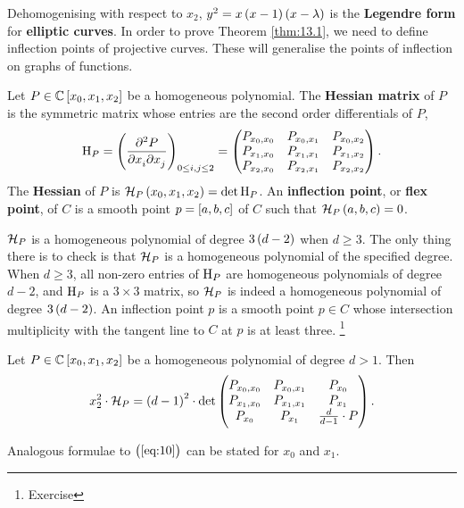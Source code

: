 Dehomogenising with respect to $ x_2 $, $ y^2 = x\br{x - 1}\br{x - \lambda} $ is the \textbf{Legendre form} for \textbf{elliptic curves}. In order to prove Theorem \ref{thm:13.1}, we need to define inflection points of projective curves. These will generalise the points of inflection on graphs of functions.

\begin{definition}
\label{def:13.2}
Let $ P \in \CC\sbr{x_0, x_1, x_2} $ be a homogeneous polynomial. The \textbf{Hessian matrix} of $ P $ is the symmetric matrix whose entries are the second order differentials of $ P $,
$$ \H_P = \br{\dmd{P}{2}{x_i}{}{x_j}{}}_{0 \le i, j \le 2} = \threebythree{P_{x_0, x_0}}{P_{x_0, x_1}}{P_{x_0, x_2}}{P_{x_1, x_0}}{P_{x_1, x_1}}{P_{x_1, x_2}}{P_{x_2, x_0}}{P_{x_2, x_1}}{P_{x_2, x_2}}. $$
The \textbf{Hessian} of $ P $ is $ \HHH_P\br{x_0, x_1, x_2} = \det \H_P $. An \textbf{inflection point}, or \textbf{flex point}, of $ C $ is a smooth point $ p = \sbr{a, b, c} $ of $ C $ such that $ \HHH_P\br{a, b, c} = 0 $.
\end{definition}

$ \mathcal{H}_P $ is a homogeneous polynomial of degree $ 3\br{d - 2} $ when $ d \ge 3 $. The only thing there is to check is that $ \mathcal{H}_P $ is a homogeneous polynomial of the specified degree. When $ d \ge 3 $, all non-zero entries of $ \mathrm{H}_P $ are homogeneous polynomials of degree $ d - 2 $, and $ \mathrm{H}_P $ is a $ 3 \times 3 $ matrix, so $ \mathcal{H}_P $ is indeed a homogeneous polynomial of degree $ 3\br{d - 2} $. An inflection point $ p $ is a smooth point $ p \in C $ whose intersection multiplicity with the tangent line to $ C $ at $ p $ is at least three. \footnote{Exercise}

\begin{lemma}
\label{lem:13.3}
Let $ P \in \CC\sbr{x_0, x_1, x_2} $ be a homogeneous polynomial of degree $ d > 1 $. Then
\begin{equation}
\label{eq:10}
x_2^2 \cdot \HHH_P = \br{d - 1}^2 \cdot \det \threebythree{P_{x_0, x_0}}{P_{x_0, x_1}}{P_{x_0}}{P_{x_1, x_0}}{P_{x_1, x_1}}{P_{x_1}}{P_{x_0}}{P_{x_1}}{\tfrac{d}{d - 1} \cdot P}.
\end{equation}
\end{lemma}

\begin{remark}
Analogous formulae to $ \br{\ref{eq:10}} $ can be stated for $ x_0 $ and $ x_1 $.
\end{remark}


